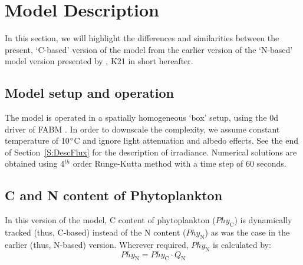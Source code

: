 \documentclass[gmd, manuscript]{copernicus}
\begin{document}
\section{Model Description}
In this section, we will highlight the differences and similarities between the present, `C-based' version of the model from the earlier version of the `N-based' model version presented by \citet{Kerimoglu2021}, K21 in short hereafter. 

\subsection{Model setup and operation}
The model is operated in a spatially homogeneous `box' setup, using the 0d driver of FABM \citep{Bruggeman2014}. In order to downscale the complexity, we assume constant temperature of 10$^{\circ}$C and ignore light attenuation and albedo effects. See the end of Section~\ref{S:DescFlux} for the description of irradiance. Numerical solutions are obtained using 4$^{th}$ order Runge-Kutta method with a time step of 60 seconds. 

\subsection{C and N content of Phytoplankton}
In this version of the model, C content of phytoplankton ($Phy_\text{C}$) is dynamically tracked (thus, C-based) instead of the N content ($Phy_\text{N}$) as was the case in the earlier (thus, N-based) version. Wherever required, $Phy_\text{N}$ is calculated by:
\begin{equation} \label{eq:Q}
Phy_\text{N} = Phy_\text{C} \cdot Q_\text{N}  
\end{equation}
\end{document}
